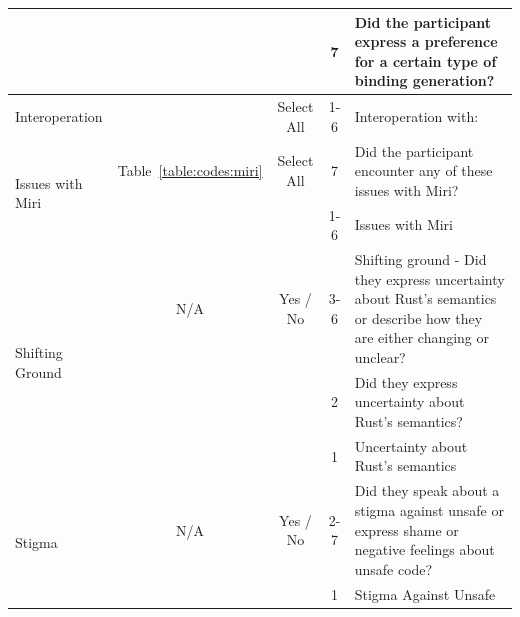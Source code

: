\begin{tabular}{|l|c|c|c|p{5cm}|}
                                           &                                     &                                 & 7               & Did the participant express a preference for a certain type of binding generation?                                         \\ \hline\hline
Interoperation                             &                                     & Select All                      & 1-6             & Interoperation with:                                                                                                       \\ \hline\hline
\multirow{2}{*}{Issues with Miri}          & Table~\ref{table:codes:miri}              & Select All                      & 7               & Did the participant encounter any of these issues with Miri?                                                               \\ \cline{4-5} 
                                           &                                     &                                 & 1-6             & Issues with Miri                                                                                                           \\ \hline\hline
\multirow{3}{*}{Shifting Ground}           & N/A                                 & Yes / No                        & 3-6             & Shifting ground - Did they express uncertainty about Rust's semantics or describe how they are either changing or unclear? \\ \cline{4-5} 
                                           &                                     &                                 & 2               & Did they express uncertainty about Rust's semantics?                                                                       \\ \cline{4-5} 
                                           &                                     &                                 & 1               & Uncertainty about Rust's semantics                                                                                         \\ \hline\hline
\multirow{2}{*}{Stigma}                    & N/A                                 & Yes / No                        & 2-7             & Did they speak about a stigma against unsafe or express shame or negative feelings about unsafe code?                      \\ \cline{4-5} 
                                           &                                     &                                 & 1               & Stigma Against Unsafe                                                                                                      \\ \hline\hline

\end{tabular}
